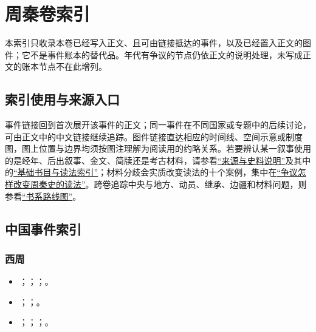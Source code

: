 \chapter{周秦卷索引}
\label{app:index}

本索引只收录本卷已经写入正文、且可由链接抵达的事件，以及已经置入正文的图件；它不是事件账本的替代品。年代有争议的节点仍依正文的说明处理，未写成正文的账本节点不在此增列。

\section{索引使用与来源入口}

事件链接回到首次展开该事件的正文；同一事件在不同国家或专题中的后续讨论，可由正文中的中文链接继续追踪。图件链接直达相应的时间线、空间示意或制度图，图上位置与边界均须按图注理解为阅读用的约略关系。若要辨认某一叙事使用的是经年、后出叙事、金文、简牍还是考古材料，请参看\hyperref[app:sources]{“来源与史料说明”}及其中的\hyperref[app:bibliography]{“基础书目与读法索引”}；材料分歧会实质改变读法的十个案例，集中在\hyperref[app:controversies]{“争议怎样改变周秦史的读法”}。跨卷追踪中央与地方、动员、继承、边疆和材料问题，则参看\hyperref[app:series-roadmap]{“书系路线图”}。

\section{中国事件索引}

\subsection*{西周}
\begin{itemize}
  \item {}；；；。
  \item {}；；。
  \item {}；；；。
\end{itemize}

